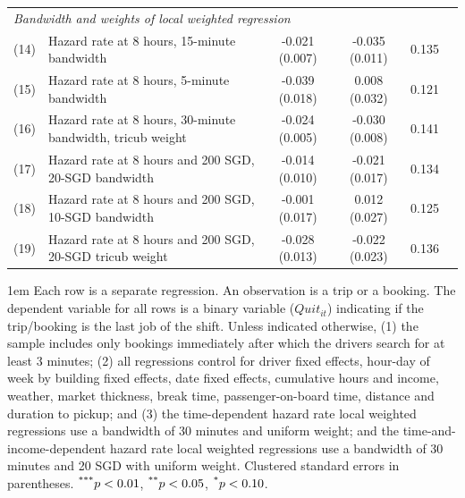 \documentclass[reviewmode,AEJ]{AEA}
\begin{document}
\begin{table}[]
\begin{tabularx}{\textwidth}{ll@{\extracolsep{\fill}}*{4}{c}}
    	\midrule
    	\multicolumn{5}{l}{\textit{Bandwidth and weights of local weighted regression}} \\
    	(14) & Hazard rate at 8 hours, 15-minute bandwidth & -0.021\sym{**} (0.007) & -0.035\sym{**} (0.011) & 0.135 \\
    	(15) & Hazard rate at 8 hours, 5-minute bandwidth & -0.039\sym{*} (0.018) & 0.008 (0.032) & 0.121 \\
    	(16) & Hazard rate at 8 hours, 30-minute bandwidth, tricub weight & -0.024\sym{***} (0.005) & -0.030\sym{***} (0.008) & 0.141 \\
    	(17) & Hazard rate at 8 hours and 200 SGD, 20-SGD bandwidth & -0.014 (0.010) & -0.021 (0.017) & 0.134 \\
    	(18) & Hazard rate at 8 hours and 200 SGD, 10-SGD bandwidth & -0.001 (0.017) & 0.012 (0.027) & 0.125 \\
    	(19) & Hazard rate at 8 hours and 200 SGD, 20-SGD tricub weight & -0.028\sym{*} (0.013) & -0.022 (0.023) & 0.136 \\
    	\bottomrule
    \end{tabularx}%
    \label{tb:immepickup}
	\begin{tablenotes}
		\parindent 1em%
		\small
	    Each row is a separate regression. An observation is a trip or a booking. The dependent variable for all rows is a binary variable ($Quit_{it}$) indicating if the trip/booking is the last job of the shift. Unless indicated otherwise, (1) the sample includes only bookings immediately after which the drivers search for at least 3 minutes; (2) all regressions control for driver fixed effects, hour-day of week by building fixed effects, date fixed effects,  cumulative hours and income, weather, market thickness, break time, passenger-on-board time, distance and duration to pickup; and (3) the time-dependent hazard rate local weighted regressions use a bandwidth of 30 minutes and uniform weight; and the time-and-income-dependent hazard rate local weighted regressions use a bandwidth of 30 minutes and 20 SGD with uniform weight. Clustered standard errors in parentheses. $\textsuperscript{***}p < 0.01$, $\textsuperscript{**}p < 0.05$, $\textsuperscript{*}p < 0.10$.  
	\end{tablenotes}
    \label{tb:robustcheck}
\end{table}

\end{document}
